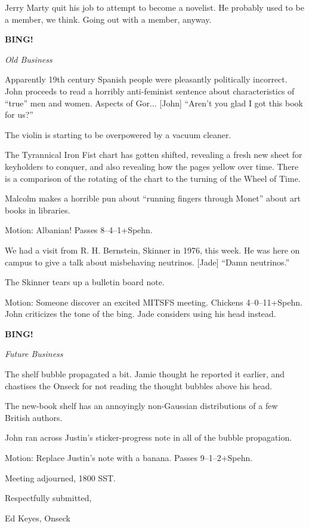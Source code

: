 \documentclass[12pt]{article}
\newcommand{\bing}{{\bf BING!} }
\newcommand{\goto}[1]{\bing \vskip 12pt \centerline{{\em{#1}}}}
\begin{document}
Jerry Marty quit his job to attempt to become a novelist.  He probably
used to be a member, we think.  Going out with a member, anyway.

\goto{Old Business}

Apparently 19th century Spanish people were pleasantly politically
incorrect.  John proceeds to read a horribly anti-feminist sentence
about characteristics of ``true'' men and women.  Aspects of Gor...
[John] ``Aren't you glad I got this book for us?''

The violin is starting to be overpowered by a vacuum cleaner.

The Tyrannical Iron Fist chart has gotten shifted, revealing a fresh
new sheet for keyholders to conquer, and also revealing how the pages
yellow over time.  There is a comparison of the rotating of the chart
to the turning of the Wheel of Time.

Malcolm makes a horrible pun about ``running fingers through Monet''
about art books in libraries.

Motion: Albanian!  Passes 8--4--1+Spehn.

We had a visit from R. H. Bernstein, Skinner in 1976, this week.  He
was here on campus to give a talk about misbehaving neutrinos.  [Jade]
``Damn neutrinos.''

The Skinner tears up a bulletin board note.

Motion: Someone discover an excited MITSFS meeting.  Chickens
4--0--11+Spehn.  John criticizes the tone of the bing.  Jade considers
using his head instead.

\goto{Future Business}

The shelf bubble propagated a bit.  Jamie thought he reported it earlier,
and chastises the Onseck for not reading the thought bubbles above his
head.

The new-book shelf has an annoyingly non-Gaussian distributions of a
few British authors.

John ran across Justin's sticker-progress note in all of the bubble
propagation.

Motion: Replace Justin's note with a banana.  Passes 9--1--2+Spehn.

\vspace{12pt}

\noindent
Meeting adjourned, 1800 SST.

\vspace{18pt}

\centerline{Respectfully submitted,}
\centerline{Ed Keyes, Onseck}
\end{document}
